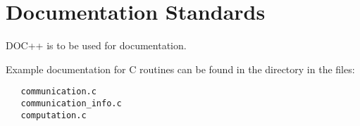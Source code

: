 \chapter{Documentation Standards}
\label{Documentation Standards}

DOC++ is to be used for documentation.

Example documentation for C routines can be found in the directory
 in the files:
\begin{verbatim}
   communication.c
   communication_info.c
   computation.c
\end{verbatim}


